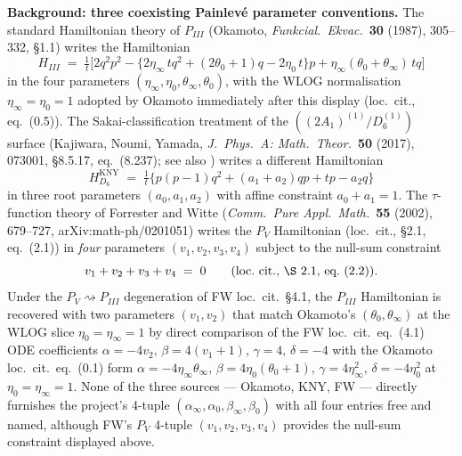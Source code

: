 \medskip
\noindent\textbf{Background: three coexisting Painlev\'e
parameter conventions.}\hspace{0.5em}
The standard Hamiltonian theory of $P_{III}$ (Okamoto,
{\em Funkcial.\ Ekvac.}\ {\bf 30} (1987), 305--332, \S 1.1)
writes the Hamiltonian
\[
  H_{III} \;=\; \tfrac{1}{t}\bigl[2 q^{2} p^{2} -
       \{2 \eta_\infty\, t q^{2} + (2 \theta_0 + 1) q
       - 2 \eta_0\, t\}p
       + \eta_\infty(\theta_0 + \theta_\infty)\, t q\bigr]
\]
in the four parameters $(\eta_\infty, \eta_0, \theta_\infty,
\theta_0)$, with the WLOG normalisation
$\eta_\infty = \eta_0 = 1$ adopted by Okamoto immediately
after this display (loc.\ cit., eq.\ (0.5)). The
Sakai-classification treatment of the
$((2 A_1)^{(1)} / D_6^{(1)})$ surface (Kajiwara, Noumi, Yamada,
{\em J.\ Phys.\ A: Math.\ Theor.}\ {\bf 50} (2017), 073001,
\S 8.5.17, eq.\ (8.237); see also \cite{noumiyamada1998painleve,
ohyama2006studies, jimbomiwa1981monodromy}) writes a different
Hamiltonian
\[
  H_{D_6}^{\mathrm{KNY}} \;=\; \tfrac{1}{t}\bigl\{p(p-1) q^{2}
       + (a_1 + a_2) q p + t p - a_2 q\bigr\}
\]
in three root parameters $(a_0, a_1, a_2)$ with affine
constraint $a_0 + a_1 = 1$. The $\tau$-function theory of
Forrester and Witte ({\em Comm.\ Pure Appl.\ Math.}\
{\bf 55} (2002), 679--727, arXiv:math-ph/0201051) writes the
$P_V$ Hamiltonian (loc.\ cit., \S 2.1, eq.\ (2.1)) in {\em four}
parameters $(v_1, v_2, v_3, v_4)$ subject to the null-sum
constraint
\[
  v_1 + v_2 + v_3 + v_4 \;=\; 0
  \qquad\text{(loc.\ cit., \S 2.1, eq.\ (2.2))}.
\]
Under the $P_V \rightsquigarrow P_{III}$ degeneration of FW
loc.\ cit.\ \S 4.1, the $P_{III}$ Hamiltonian is recovered with
two parameters $(v_1, v_2)$ that match Okamoto's
$(\theta_0, \theta_\infty)$ at the WLOG slice
$\eta_0 = \eta_\infty = 1$ by direct comparison of the FW
loc.\ cit.\ eq.\ (4.1) ODE coefficients $\alpha = -4 v_2,\,
\beta = 4(v_1 + 1),\, \gamma = 4,\, \delta = -4$ with the
Okamoto loc.\ cit.\ eq.\ (0.1) form
$\alpha = -4 \eta_\infty \theta_\infty,\,
\beta = 4 \eta_0 (\theta_0 + 1),\, \gamma = 4 \eta_\infty^{2},\,
\delta = -4 \eta_0^{2}$ at $\eta_0 = \eta_\infty = 1$. None of
the three sources --- Okamoto, KNY, FW --- directly furnishes
the project's 4-tuple
$(\alpha_\infty, \alpha_0, \beta_\infty, \beta_0)$ with all
four entries free and named, although FW's $P_V$ 4-tuple
$(v_1, v_2, v_3, v_4)$ provides the null-sum constraint
displayed above.

